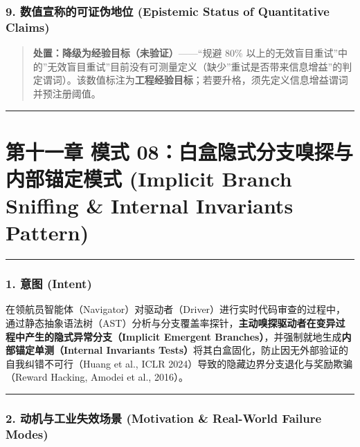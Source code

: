 \documentclass[
]{ctexart}
\renewcommand{\_}{\discretionary{}{}{\textunderscore}}
\let\oldsection\section
\renewcommand{\section}{\clearpage\oldsection}
\begin{document}
\subsubsection{9. 数值宣称的可证伪地位 (Epistemic Status of Quantitative
Claims)}\label{ux6570ux503cux5ba3ux79f0ux7684ux53efux8bc1ux4f2aux5730ux4f4d-epistemic-status-of-quantitative-claims-2}

\begin{quote}
\textbf{处置：降级为经验目标（未验证）}------``规避 80\%
以上的无效盲目重试''中的''无效盲目重试''目前没有可测量定义（缺少''重试是否带来信息增益''的判定谓词）。该数值标注为\textbf{工程经验目标}；若要升格，须先定义信息增益谓词并预注册阈值。
\end{quote}

\begin{center}\rule{0.5\linewidth}{0.5pt}\end{center}

\section{第十一章 模式 08：白盒隐式分支嗅探与内部锚定模式 (Implicit Branch
Sniffing \& Internal Invariants
Pattern)}\label{ux6a21ux5f0f-08ux767dux76d2ux9690ux5f0fux5206ux652fux55c5ux63a2ux4e0eux5185ux90e8ux951aux5b9aux6a21ux5f0f-implicit-branch-sniffing-internal-invariants-pattern}

\begin{center}\rule{0.5\linewidth}{0.5pt}\end{center}

\subsubsection{1. 意图 (Intent)}\label{ux610fux56fe-intent-7}

在领航员智能体（Navigator）对驱动者（Driver）进行实时代码审查的过程中，通过静态抽象语法树（AST）分析与分支覆盖率探针，\textbf{主动嗅探驱动者在变异过程中产生的隐式异常分支（Implicit
Emergent Branches）}，并强制就地生成\textbf{内部锚定单测（Internal
Invariants Tests）}将其白盒固化，防止因无外部验证的自我纠错不可行（Huang
et al., ICLR 2024）导致的隐藏边界分支退化与奖励欺骗（Reward Hacking,
Amodei et al., 2016）。

\begin{center}\rule{0.5\linewidth}{0.5pt}\end{center}

\subsubsection{2. 动机与工业失效场景 (Motivation \& Real-World Failure
Modes)}\label{ux52a8ux673aux4e0eux5de5ux4e1aux5931ux6548ux573aux666f-motivation-real-world-failure-modes-7}
\end{document}
